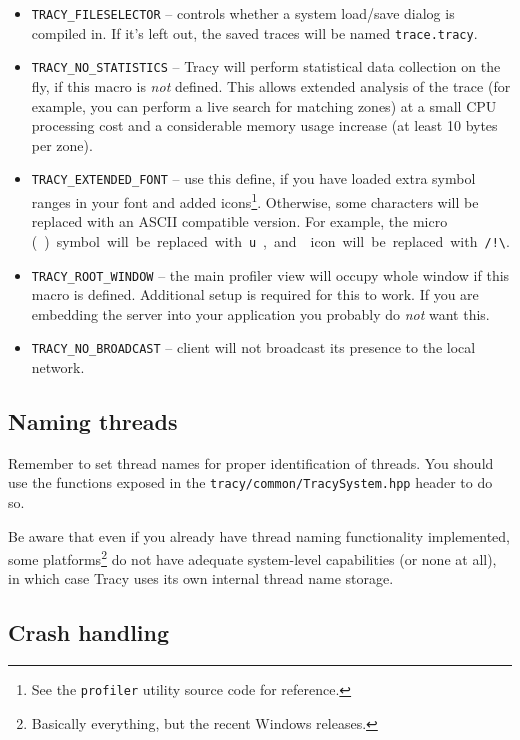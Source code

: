 \documentclass[hidelinks,titlepage,a4paper]{article}
\begin{document}
\begin{itemize}
\item \texttt{TRACY\_FILESELECTOR} -- controls whether a system load/save dialog is compiled in. If it's left out, the saved traces will be named \texttt{trace.tracy}.
\item \texttt{TRACY\_NO\_STATISTICS} -- Tracy will perform statistical data collection on the fly, if this macro is \emph{not} defined. This allows extended analysis of the trace (for example, you can perform a live search for matching zones) at a small CPU processing cost and a considerable memory usage increase (at least 10 bytes per zone).
\item \texttt{TRACY\_EXTENDED\_FONT} -- use this define, if you have loaded extra symbol ranges in your font and added icons\footnote{See the \texttt{profiler} utility source code for reference.}. Otherwise, some characters will be replaced with an ASCII compatible version. For example, the micro (\si\micro) symbol will be replaced with \texttt{u}, and \faExclamationTriangle{} icon will be replaced with \texttt{/!\textbackslash}.
\item \texttt{TRACY\_ROOT\_WINDOW} -- the main profiler view will occupy whole window if this macro is defined. Additional setup is required for this to work. If you are embedding the server into your application you probably do \emph{not} want this.
\item \texttt{TRACY\_NO\_BROADCAST} -- client will not broadcast its presence to the local network.
\end{itemize}

\subsection{Naming threads}

Remember to set thread names for proper identification of threads. You should use the functions exposed in the \texttt{tracy/common/TracySystem.hpp} header to do so.

Be aware that even if you already have thread naming functionality implemented, some platforms\footnote{Basically everything, but the recent Windows releases.} do not have adequate system-level capabilities (or none at all), in which case Tracy uses its own internal thread name storage.

\subsection{Crash handling}
\label{crashhandling}
\end{document}
